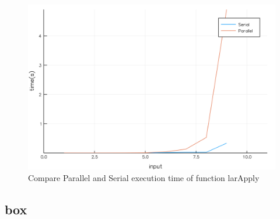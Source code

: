 \documentclass[a4paper,12pt]{article}
\begin{document}
\begin{figure}[!h]
\centering
\includegraphics[scale=0.08]{larApplyC.png}
\caption{Compare Parallel and Serial execution time of function larApply}
\end{figure}
\newpage


\subsection{box}
\end{document}
